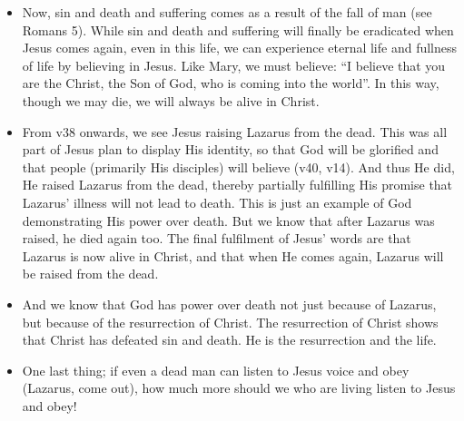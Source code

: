 \begin{itemize}
  \item{Now, sin and death and suffering comes as a result of the fall of man (see Romans 5). While sin and death and suffering will finally be eradicated when Jesus comes again, even in this life, we can experience eternal life and fullness of life by believing in Jesus. Like Mary, we must believe: “I believe that you are the Christ, the Son of God, who is coming into the world”. In this way, though we may die, we will always be alive in Christ.}
  \item{From v38 onwards, we see Jesus raising Lazarus from the dead. This was all part of Jesus plan to display His identity, so that God will be glorified and that people (primarily His disciples) will believe (v40, v14). And thus He did, He raised Lazarus from the dead, thereby partially fulfilling His promise that Lazarus’ illness will not lead to death. This is just an example of God demonstrating His power over death. But we know that after Lazarus was raised, he died again too. The final fulfilment of Jesus’ words are that Lazarus is now alive in Christ, and that when He comes again, Lazarus will be raised from the dead. }
  \item{And we know that God has power over death not just because of Lazarus, but because of the resurrection of Christ. The resurrection of Christ shows that Christ has defeated sin and death. He is the resurrection and the life. }
  \item{One last thing; if even a dead man can listen to Jesus voice and obey (Lazarus, come out), how much more should we who are living listen to Jesus and obey!}
\end{itemize}